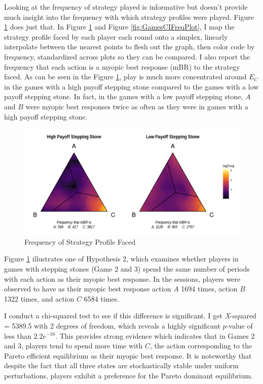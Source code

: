 Looking at the frequency of strategy played is informative but doesn't provide much insight into the frequency with which strategy profiles were played. Figure \ref{fig:Games23FreqPlot} does just that. In Figure \ref{fig:Games23FreqPlot} and Figure \ref{fig:GamesCIFreqPlot}, I map the strategy profile faced by each player each round onto a simplex, linearly interpolate between the nearest points to flesh out the graph, then color code by frequency, standardized across plots so they can be compared. I also report the frequency that each action is a myopic best response (mBR) to the strategy faced. As can be seen in the Figure \ref{fig:Games23FreqPlot}, play is much more concentrated around $E_C$ in the games with a high payoff stepping stone compared to the games with a low payoff stepping stone. In fact, in the games with a low payoff stepping stone, $A$ and $B$ were myopic best responses twice as often as they were in games with a high payoff stepping stone.

\begin{figure}[h]
\captionsetup{justification=centering}
  \caption{Frequency of Strategy Profile Faced}
   \label{fig:Games23FreqPlot}
    \includegraphics[width = \textwidth]{Images/Games23FreqPlot.png}
\end{figure}

Figure \ref{fig:Games23FreqPlot} illustrates one of Hypothesis 2, which examines whether players in games with stepping stones (Game 2 and 3) spend the same number of periods with each action as their myopic best response. In the sessions, players were observed to have as their myopic best response action $A$ 1694 times, action $B$ 1322 times, and action $C$ 6584 times. 

I conduct a chi-squared test to see if this difference is significant. I get \textit{X}-squared = 5389.5 with 2 degrees of freedom, which reveals a highly significant $p$-value of less than $2.2e^{-16}$. This provides strong evidence which indicates that in Games 2 and 3, players tend to spend more time with $C$, the action corresponding to the Pareto efficient equilibrium as their myopic best response. It is noteworthy that despite the fact that all three states are stochastically stable under uniform perturbations, players exhibit a preference for the Pareto dominant equilibrium.

